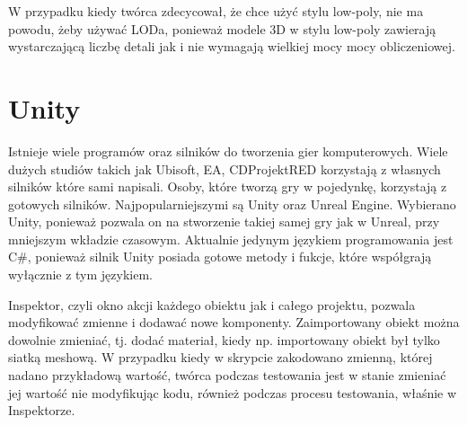 \indent W przypadku kiedy twórca zdecycował, że chce użyć stylu low-poly, nie ma powodu, żeby używać LODa, ponieważ modele 3D w stylu low-poly zawierają wystarczającą liczbę detali jak i nie wymagają wielkiej mocy mocy obliczeniowej.


\section{Unity}

\indent Istnieje wiele programów oraz silników do tworzenia gier komputerowych. Wiele dużych studiów takich jak Ubisoft, EA, CDProjektRED korzystają z własnych silników które sami napisali. Osoby, które tworzą gry w pojedynkę, korzystają z gotowych silników. Najpopularniejszymi są Unity oraz Unreal Engine. Wybierano Unity, ponieważ pozwala on na stworzenie takiej samej gry jak w Unreal, przy mniejszym wkładzie czasowym. Aktualnie jedynym językiem programowania jest C\#, ponieważ silnik Unity posiada gotowe metody i fukcje, które współgrają wyłącznie z tym językiem.

\indent Inspektor, czyli okno akcji każdego obiektu jak i całego projektu, pozwala modyfikować zmienne i dodawać nowe komponenty. Zaimportowany obiekt można dowolnie zmieniać, tj. dodać materiał, kiedy np. importowany obiekt był tylko siatką meshową. W przypadku kiedy w skrypcie zakodowano zmienną, której nadano przykładową wartość, twórca podczas testowania jest w stanie zmieniać jej wartość nie modyfikując kodu, również podczas procesu testowania, właśnie w Inspektorze. 

